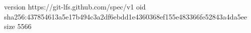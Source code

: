 version https://git-lfs.github.com/spec/v1
oid sha256:437854613a5e17b494c3a2df6ebdd1e4360368ef155e483366fe52843a4da5ee
size 5566
